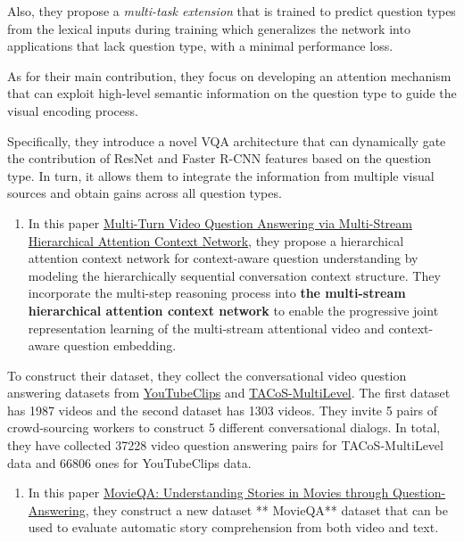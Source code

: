 \documentclass{acm_proc_article-sp}
\providecommand{\tightlist}{%
  \setlength{\itemsep}{0pt}\setlength{\parskip}{0pt}}
\begin{document}
Also, they propose a \emph{multi-task extension} that is trained to
predict question types from the lexical inputs during training which
generalizes the network into applications that lack question type, with
a minimal performance loss.

As for their main contribution, they focus on developing an attention
mechanism that can exploit high-level semantic information on the
question type to guide the visual encoding process.

Specifically, they introduce a novel VQA architecture that can
dynamically gate the contribution of ResNet and Faster R-CNN features
based on the question type. In turn, it allows them to integrate the
information from multiple visual sources and obtain gains across all
question types.

\begin{enumerate}
\def\labelenumi{\arabic{enumi}.}
\setcounter{enumi}{2}
\tightlist
\item
  In this paper
  \href{https://www.ijcai.org/proceedings/2018/0513.pdf}{Multi-Turn
  Video Question Answering via Multi-Stream Hierarchical Attention
  Context Network}, they propose a hierarchical attention context
  network for context-aware question understanding by modeling the
  hierarchically sequential conversation context structure. They
  incorporate the multi-step reasoning process into \textbf{the
  multi-stream hierarchical attention context network} to enable the
  progressive joint representation learning of the multi-stream
  attentional video and context-aware question embedding.
\end{enumerate}

To construct their dataset, they collect the conversational video
question answering datasets from
\href{http://upplysingaoflun.ecn.purdue.edu/~yu239/}{YouTubeClips} and
\href{https://www.mpi-inf.mpg.de/departments/computer-vision-and-multimodal-computing/research/vision-and-language/tacos-multi-level-corpus/}{TACoS-MultiLevel}.
The first dataset has 1987 videos and the second dataset has 1303
videos. They invite 5 pairs of crowd-sourcing workers to construct 5
different conversational dialogs. In total, they have collected 37228
video question answering pairs for TACoS-MultiLevel data and 66806 ones
for YouTubeClips data.

\begin{enumerate}
\def\labelenumi{\arabic{enumi}.}
\setcounter{enumi}{3}
\tightlist
\item
  In this paper \href{https://arxiv.org/pdf/1512.02902.pdf}{MovieQA:
  Understanding Stories in Movies through Question-Answering}, they
  construct a new dataset ** MovieQA** dataset that can be used to
  evaluate automatic story comprehension from both video and text.
\end{enumerate}
\end{document}
